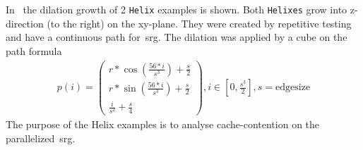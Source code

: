 \documentclass{article}
\begin{document}
In~ the dilation growth of 2 \texttt{Helix} examples is shown.
Both \texttt{Helixes} grow into z-direction (to the right) on the xy-plane.
They were created by repetitive testing and have a continuous path for~\ac{srg}.
The dilation was applied by a cube on the path formula
\begin{align}
  p(i) = \begin{pmatrix}
    r * \cos (\frac{56*i}{s^3}) + \frac{s}{2} \\
    r * \sin (\frac{56*i}{s^3}) + \frac{s}{2} \\
    \frac{i}{s^2} + \frac{s}{4}
  \end{pmatrix}, i \in [0,\frac{s^3}{2}], s=\text{edgesize}
\end{align}
The purpose of the Helix examples is to analyse cache-contention on the parallelized~\ac{srg}.
\end{document}
